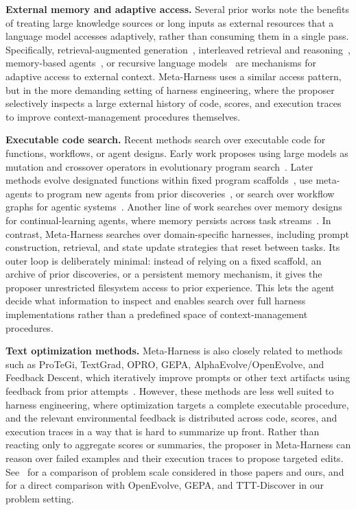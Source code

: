 \textbf{External memory and adaptive access.}
Several prior works note the benefits of treating large knowledge sources or long inputs as external resources that a language model accesses adaptively, rather than consuming them in a single pass.
Specifically, retrieval-augmented generation~\citep{lewis2020retrieval}, interleaved retrieval and reasoning~\citep{trivedi2023interleavingretrievalchainofthoughtreasoning}, memory-based agents~\citep{packer2023memgpt}, or recursive language models~\citep{zhang2026recursivelanguagemodels} are mechanisms for adaptive access to external context.
Meta-Harness uses a similar access pattern, but in the more demanding setting of harness engineering, where the proposer selectively inspects a large external history of code, scores, and execution traces to improve context-management procedures themselves.

\textbf{Executable code search.} Recent methods search over executable code for functions, workflows, or agent designs.
Early work proposes using large models as mutation and crossover operators in evolutionary program search~\citep{lehman2022evolutionlargemodels}.
Later methods evolve designated functions within fixed program scaffolds~\citep{romera2024mathematical}, use meta-agents to program new agents from prior discoveries~\citep{hu2025automated}, or search over workflow graphs for agentic systems~\citep{zhang2025aflowautomatingagenticworkflow}.
Another line of work searches over memory designs for continual-learning agents, where memory persists across task streams~\citep{zhang2025memevolve,Xiong2026LearningTC}.
In contrast, Meta-Harness searches over domain-specific harnesses, including prompt construction, retrieval, and state update strategies that reset between tasks.
Its outer loop is deliberately minimal: instead of relying on a fixed scaffold, an archive of prior discoveries, or a persistent memory mechanism, it gives the proposer unrestricted filesystem access to prior experience.
This lets the agent decide what information to inspect and enables search over full harness implementations rather than a predefined space of context-management procedures.

\textbf{Text optimization methods.} Meta-Harness is also closely related to methods such as ProTeGi, TextGrad, OPRO, GEPA, AlphaEvolve/OpenEvolve, and Feedback Descent, which iteratively improve prompts or other text artifacts using feedback from prior attempts~\citep{pryzant2023protegi,madaan2023self,yuksekgonul2024textgradautomaticdifferentiationtext,yang2023large,agrawal2025gepa,novikov2025alphaevolve,openevolve,lee2025feedback}.
However, these methods are less well suited to harness engineering, where optimization targets a complete executable procedure, and the relevant environmental feedback is distributed across code, scores, and execution traces in a way that is hard to summarize up front.
Rather than reacting only to aggregate scores or summaries, the proposer in Meta-Harness can reason over failed examples and their execution traces to propose targeted edits.
See~ for a comparison of problem scale considered in those papers and ours, and~ for a direct comparison with OpenEvolve, GEPA, and TTT-Discover in our problem setting.

